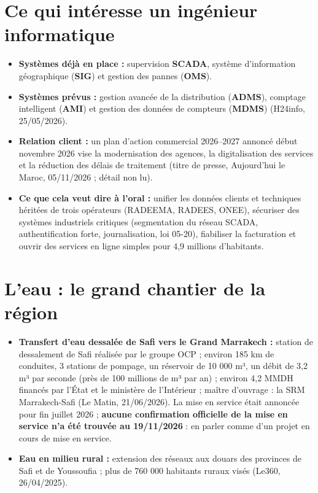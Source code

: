 \section{Ce qui intéresse un ingénieur informatique}
\begin{itemize}
    \item \textbf{Systèmes déjà en place :} supervision \textbf{SCADA}, système d'information géographique (\textbf{SIG}) et gestion des pannes (\textbf{OMS}).
    \item \textbf{Systèmes prévus :} gestion avancée de la distribution (\textbf{ADMS}), comptage intelligent (\textbf{AMI}) et gestion des données de compteurs (\textbf{MDMS}) (H24info, 25/05/2026).
    \item \textbf{Relation client :} un plan d'action commercial 2026--2027 annoncé début novembre 2026 vise la modernisation des agences, la digitalisation des services et la réduction des délais de traitement (titre de presse, Aujourd'hui le Maroc, 05/11/2026 ; détail non lu).
    \item \textbf{Ce que cela veut dire à l'oral :} unifier les données clients et techniques héritées de trois opérateurs (RADEEMA, RADEES, ONEE), sécuriser des systèmes industriels critiques (segmentation du réseau SCADA, authentification forte, journalisation, loi 05-20), fiabiliser la facturation et ouvrir des services en ligne simples pour 4,9 millions d'habitants.
\end{itemize}

\section{L'eau : le grand chantier de la région}
\begin{itemize}
    \item \textbf{Transfert d'eau dessalée de Safi vers le Grand Marrakech :} station de dessalement de Safi réalisée par le groupe OCP ; environ 185 km de conduites, 3 stations de pompage, un réservoir de 10 000 m³, un débit de 3,2 m³ par seconde (près de 100 millions de m³ par an) ; environ 4,2 MMDH financés par l'État et le ministère de l'Intérieur ; maître d'ouvrage : la SRM Marrakech-Safi (Le Matin, 21/06/2026). La mise en service était annoncée pour fin juillet 2026 ; \textbf{aucune confirmation officielle de la mise en service n'a été trouvée au 19/11/2026} : en parler comme d'un projet en cours de mise en service.
    \item \textbf{Eau en milieu rural :} extension des réseaux aux douars des provinces de Safi et de Youssoufia ; plus de 760 000 habitants ruraux visés (Le360, 26/04/2025).
\end{itemize}

